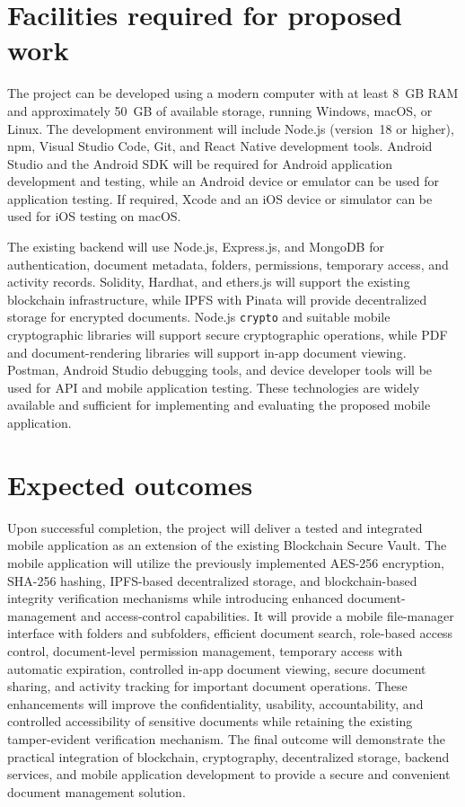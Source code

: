 \documentclass[12pt]{article}
\begin{document}
\newpage
\section{Facilities required for proposed work}

The project can be developed using a modern computer with at least 8~GB RAM and approximately 50~GB of available storage, running Windows, macOS, or Linux. The development environment will include Node.js (version~18 or higher), npm, Visual Studio Code, Git, and React Native development tools. Android Studio and the Android SDK will be required for Android application development and testing, while an Android device or emulator can be used for application testing. If required, Xcode and an iOS device or simulator can be used for iOS testing on macOS.

The existing backend will use Node.js, Express.js, and MongoDB for authentication, document metadata, folders, permissions, temporary access, and activity records. Solidity, Hardhat, and ethers.js will support the existing blockchain infrastructure, while IPFS with Pinata will provide decentralized storage for encrypted documents. Node.js \texttt{crypto} and suitable mobile cryptographic libraries will support secure cryptographic operations, while PDF and document-rendering libraries will support in-app document viewing. Postman, Android Studio debugging tools, and device developer tools will be used for API and mobile application testing. These technologies are widely available and sufficient for implementing and evaluating the proposed mobile application.

\newpage
\section{Expected outcomes}

Upon successful completion, the project will deliver a tested and integrated mobile application as an extension of the existing Blockchain Secure Vault. The mobile application will utilize the previously implemented AES-256 encryption, SHA-256 hashing, IPFS-based decentralized storage, and blockchain-based integrity verification mechanisms while introducing enhanced document-management and access-control capabilities. It will provide a mobile file-manager interface with folders and subfolders, efficient document search, role-based access control, document-level permission management, temporary access with automatic expiration, controlled in-app document viewing, secure document sharing, and activity tracking for important document operations. These enhancements will improve the confidentiality, usability, accountability, and controlled accessibility of sensitive documents while retaining the existing tamper-evident verification mechanism. The final outcome will demonstrate the practical integration of blockchain, cryptography, decentralized storage, backend services, and mobile application development to provide a secure and convenient document management solution.


\newpage


\end{document}
